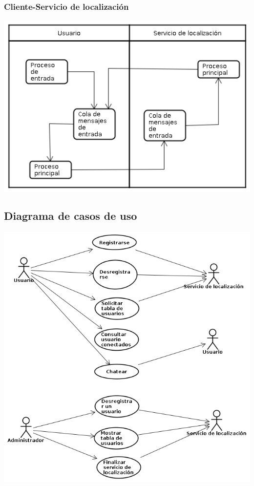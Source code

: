\subsubsection{Cliente-Servicio de localización}
\begin{center}
\small\includegraphics[scale=0.65]{./Images/ArquitecturaClienteConServidor}
\end{center}

\subsection{Diagrama de casos de uso}
\begin{center}
\small\includegraphics[scale=0.55]{./Images/CasosDeUso}
\end{center}

